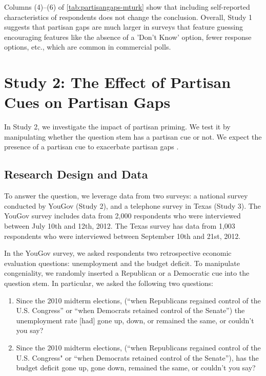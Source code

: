 \documentclass[12pt, letterpaper]{article}
\begin{document}
Columns (4)--(6) of \cref{tab:partisangaps-mturk} show that including self-reported characteristics of respondents does not change the conclusion. Overall, Study 1 suggests that partisan gaps are much larger in surveys that feature guessing encouraging features like the absence of a 'Don't Know' option, fewer response options, etc., which are common in commercial polls.

\section*{Study 2: The Effect of Partisan Cues on Partisan Gaps}\label{sec:partisan_cues}

In Study 2, we investigate the impact of partisan priming. We test it by manipulating whether the question stem has a partisan cue or not. We expect the presence of a partisan cue to exacerbate partisan gaps \citep{prior2015you}. 

\subsection*{Research Design and Data}\label{subsec:data2}

To answer the question, we leverage data from two surveys: a national survey conducted by YouGov (Study 2), and a telephone survey in Texas (Study 3). The YouGov survey includes data from 2,000 respondents who were interviewed between July 10th and 12th, 2012. The Texas survey has data from 1,003 respondents who were interviewed between September 10th and 21st, 2012.

In the YouGov survey, we asked respondents two retrospective economic evaluation questions: unemployment and the budget deficit. To manipulate congeniality, we randomly inserted a Republican or a Democratic cue into the question stem. In particular, we asked the following two questions:

\begin{enumerate}
\item Since the 2010 midterm elections, (``when Republicans regained control of the U.S. Congress'' or ``when Democrats retained control of the Senate'') the unemployment rate [had] gone up, down, or remained the same, or couldn't you say? 
\item Since the 2010 midterm elections, (``when Republicans regained control of the U.S. Congress" or ``when Democrats retained control of the Senate''), has the budget deficit gone up, gone down, remained the same, or couldn't you say?
\end{enumerate}
\end{document}
